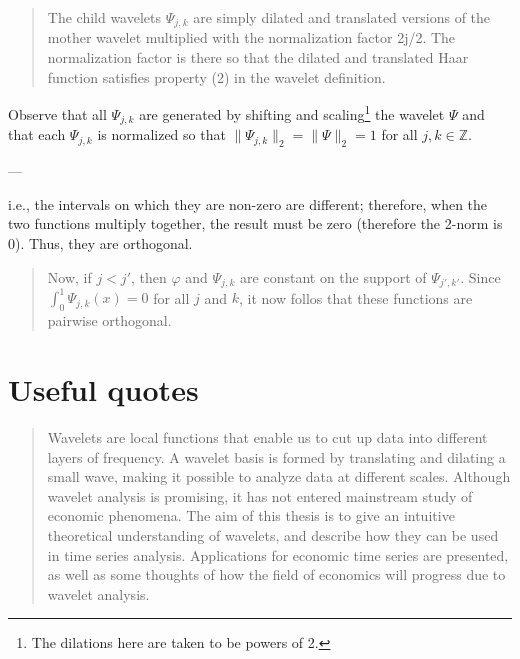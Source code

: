 \documentclass[2pt]{amsart}
\theoremstyle{theorem} %
\theoremstyle{definition}
\theoremstyle{example}
\theoremstyle{remark}
\numberwithin{equation}{section}
\newcommand{\Z}{\mathbb{Z}}
\begin{document}
\begin{quote}
	The child wavelets $ \varPsi_{j,k} $ are simply dilated and translated versions of the mother wavelet multiplied with the normalization factor 2j/2. The normalization factor is there so that the dilated and translated Haar function satisfies property (2) in the wavelet	definition.
\end{quote}

Observe that all $ \varPsi_{j,k} $ are generated by shifting and scaling\footnote{The dilations here are taken to be powers of 2.} the wavelet $ \varPsi $ and that each $ \varPsi_{j,k} $ is normalized so that $ \| \varPsi_{j,k}\|_2 = \|\varPsi\|_2 = 1 $ for all $ j,k \in \Z $.

---

i.e., the intervals on which they are non-zero are different; therefore, when the two functions multiply together, the result must be zero (therefore the 2-norm is 0). Thus, they are orthogonal. 
\begin{quote}
	Now, if $ j < j' $, then $ \varphi $ and $ \varPsi_{j,k} $ are constant on the support of $ \varPsi_{j',k'} $. Since $ \int_0^1 \varPsi_{j,k}(x) = 0 $ for all $ j $ and $ k $, it now follos that these functions are pairwise orthogonal.
\end{quote}

\section{Useful quotes}
\begin{quote}
	Wavelets are local functions that enable us to cut up data into different layers of frequency. A wavelet basis is formed by translating and dilating a small wave, making it
	possible to analyze data at different scales. Although wavelet analysis is promising, it
	has not entered mainstream study of economic phenomena. The aim of this thesis is to
	give an intuitive theoretical understanding of wavelets, and describe how they can be
	used in time series analysis. Applications for economic time series are presented, as well
	as some thoughts of how the field of economics will progress due to wavelet analysis.
\end{quote}
\end{document}
